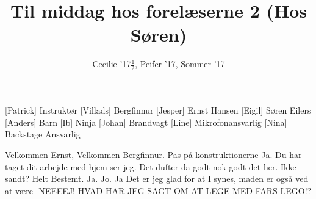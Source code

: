\documentclass[a4paper,11pt]{article}
\title{Til middag hos forelæserne 2 (Hos Søren)}
\author{Cecilie '17$\frac{1}{2}$, Peifer '17, Sommer '17}
\begin{document}
\maketitle

\begin{roles}
[Patrick] Instruktør
[Villads] Bergfinnur
[Jesper] Ernst Hansen
[Eigil] Søren Eilers
[Anders] Barn
[Ib] Ninja
[Johan] Brandvagt
[Line] Mikrofonansvarlig
[Nina] Backstage Ansvarlig
\end{roles}

\begin{sketch}

 Velkommen Ernst, Velkommen Bergfinnur. Pas på konstruktionerne
 Ja. Du har taget dit arbejde med hjem ser jeg.
 Det dufter da godt nok godt det her.  Ikke sandt?
 Helt Bestemt. Ja. Jo. Ja
 Det er jeg glad for at I synes, maden er også ved at være-
 NEEEEJ! HVAD HAR JEG SAGT OM AT LEGE MED FARS LEGO!?


\end{sketch}
\end{document}
